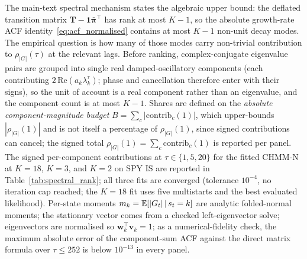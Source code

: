 The main-text spectral mechanism states the algebraic upper bound: the deflated transition matrix $\mathbf T - \mathbf 1\bar{\boldsymbol\pi}^\top$ has rank at most $K - 1$, so the absolute growth-rate ACF identity~\eqref{eq:acf_normalised} contains at most $K - 1$ non-unit decay modes. The empirical question is how many of those modes carry non-trivial contribution to $\rho_{|G|}(\tau)$ at the relevant lags. Before ranking, complex-conjugate eigenvalue pairs are grouped into single real damped-oscillatory components (each contributing $2\,\mathrm{Re}(a_k \lambda_k^\tau)$; phase and cancellation therefore enter with their signs), so the unit of account is a real component rather than an eigenvalue, and the component count is at most $K - 1$. Shares are defined on the \emph{absolute component-magnitude budget} $B = \sum_c |\mathrm{contrib}_c(1)|$, which upper-bounds $|\rho_{|G|}(1)|$ and is not itself a percentage of $\rho_{|G|}(1)$, since signed contributions can cancel; the signed total $\rho_{|G|}(1) = \sum_c \mathrm{contrib}_c(1)$ is reported per panel. The signed per-component contributions at $\tau \in \{1, 5, 20\}$ for the fitted CHMM-N at $K = 18$, $K = 3$, and $K = 2$ on SPY IS are reported in Table~\ref{tab:spectral_rank}; all three fits are converged (tolerance $10^{-4}$, no iteration cap reached; the $K = 18$ fit uses five multistarts and the best evaluated likelihood). Per-state moments $m_k = \mathbb{E}[|G_t| \,|\, s_t = k]$ are analytic folded-normal moments; the stationary vector comes from a checked left-eigenvector solve; eigenvectors are normalised so $\mathbf w_k^\top \mathbf v_k = 1$; as a numerical-fidelity check, the maximum absolute error of the component-sum ACF against the direct matrix formula over $\tau \le 252$ is below $10^{-13}$ in every panel.

